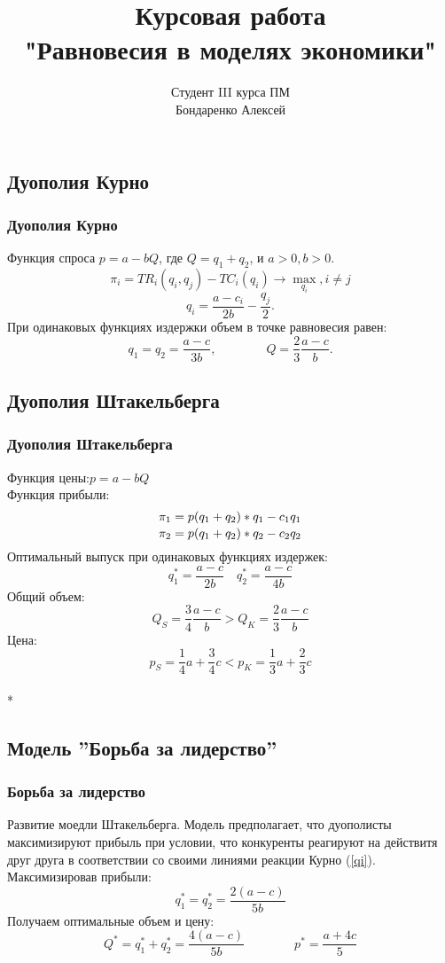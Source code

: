 \documentclass {beamer}
\title{Курсовая работа\\ "Равновесия в моделях экономики"}
\author {Студент III курса ПМ \\ Бондаренко Алексей}
\date{}
\begin{document}
\begin{frame}
\maketitle
\end{frame}

\begin{frame}
\section{Дуополия Курно}
\frametitle{Дуополия Курно}
Функция спроса $p=a-bQ$, где $Q=q_1+q_2$, и $a>0,b>0.$ $$\pi_i=TR_i(q_i,q_j)-TC_i(q_i)\to \max_{q_i} ,i\ne j$$
\begin{equation} \label{qi}  q_i = \frac{a-c_i}{2b}-\frac {q_j}{2}.  \end{equation}
При одинаковых функциях издержки объем в точке равновесия равен: $$q_1 =q_2 = \frac {a-c}{3b}, \qquad\qquad Q=\frac{2}{3}\frac{a-c}{b}.$$
\end{frame}

\begin{frame}
\section{Дуополия Штакельберга}
\frametitle{Дуополия Штакельберга}
Функция цены:\qquad\quad $p=a-bQ$ \\Функция прибыли: $${\pi_1 = p(q_1+q_2)*q_1-c_1 q_1 \atop \pi_2 = p(q_1+q_2)*q_2-c_2 q_2 }$$ Оптимальный выпуск при одинаковых функциях издержек:$$q^*_1=\frac{a-c}{2b} \quad q^*_2=\frac{a-c}{4b}$$\newpage Общий объем: $$Q_S=\frac{3}{4}\frac{a-c}{b}>Q_K=\frac{2}{3}\frac{a-c}{b} $$ Цена:$$ p_S=\frac{1}{4}a+\frac{3}{4}c<p_K=\frac{1}{3}a+\frac{2}{3}c$$\\*
\end{frame}

\begin{frame}
\section{Модель ''Борьба за лидерство''}
\frametitle{Борьба за лидерство}
Развитие моедли Штакельберга. Модель предполагает, что дуополисты максимизируют прибыль при условии, что конкуренты реагируют на действитя друг друга в соответствии со своими линиями реакции Курно (\ref{qi}). Максимизировав прибыли: $$q_1^* = q_2^* = \frac{2(a-c)}{5b} $$ Получаем оптимальные объем и цену: $$ Q^*=q_1^*+q_2^* = \frac{4(a-c)}{5b} \qquad \qquad p^*=\frac{a+4c}{5}$$
\end{frame}
\end{document}
